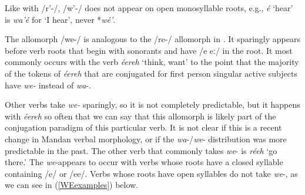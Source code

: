 Like with /r'-/, /w'-/ does not appear on open monosyllable roots, e.g., \textit{é} `hear' is \textit{wa'é} for `I hear', never *\textit{wé'}.

\label{allomorphWE}

The allomorph /we-/ is analogous to the /re-/ allomorph in . It sparingly appears before verb roots that begin with sonorants and have /e eː/ in the root. It most commonly occurs with the verb \textit{éereh} `think, want' to the point that the majority of the tokens of \textit{éereh} that are conjugated for first person singular active subjects have \textit{we-} instead of \textit{wa}-.

Other verbs take \textit{we-} sparingly, so it is not completely predictable, but it happens with \textit{éereh} so often that we can say that this allomorph is likely part of the conjugation paradigm of this particular verb. It is not clear if this is a recent change in Mandan verbal morphology, or if the \textit{wa}-/\textit{we}- distribution was more predictable in the past. The other verb that commonly takes \textit{we}- is \textit{réeh} `go there.' The \textit{we}-appears  to occur with verbs whose roots have a closed syllable containing /e/ or /ee/. Verbs whose roots have open syllables do not take \textit{we}-, as we can see in (\ref{WEexamples}) below.



